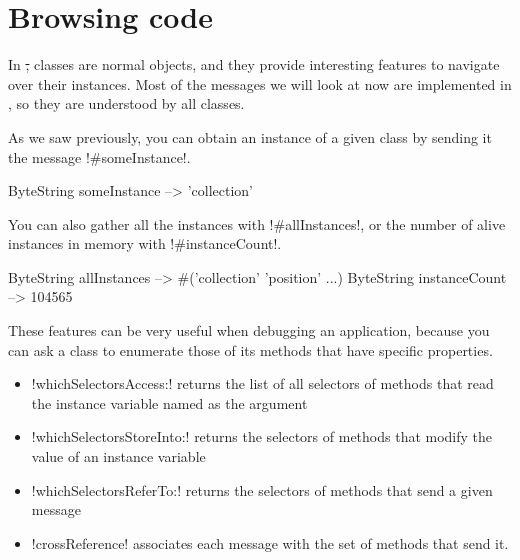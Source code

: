 \documentclass[a4paper,10pt,twoside]{book}
\begin{document}
\section{Browsing code} %

In \st, classes are normal objects, and they provide interesting features to navigate over their instances.
Most of the messages we will look at now are implemented in , so they are understood by all classes.

As we saw previously, you can obtain an instance of a given class by sending it the message \ct!#someInstance!.

\begin{code}{} %
ByteString someInstance --> 'collection'
\end{code}

You can also gather all the instances with \ct!#allInstances!, or the number of alive instances in memory with \ct!#instanceCount!.

\begin{code}{} %
ByteString allInstances     --> #('collection' 'position'  ...)
ByteString instanceCount --> 104565
\end{code}

These features can be very useful when debugging an application, because you can ask a class to enumerate those of its methods that have specific properties.
\begin{itemize}
\item \ct!whichSelectorsAccess:! returns the list of all selectors of methods that read the instance variable named as the argument
\item \ct!whichSelectorsStoreInto:! returns the selectors of methods that modify the value of an instance variable
\item \ct!whichSelectorsReferTo:! returns the selectors of methods that send a given message
\item \ct!crossReference! associates each message with the set of methods that send it.
\end{itemize}

\end{document}
